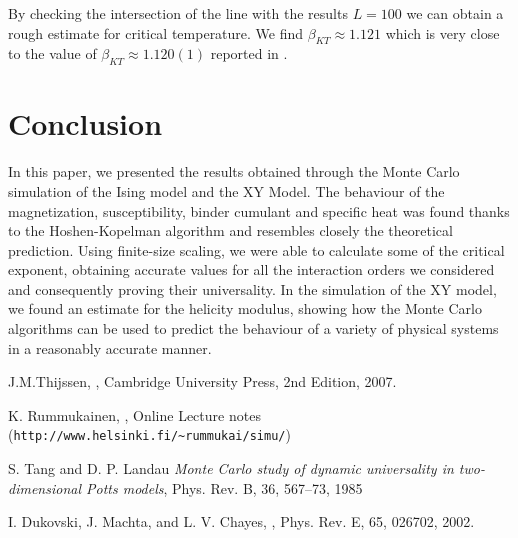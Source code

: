 \documentclass[twoside]{article}
\begin{document}
\begin{multicols}{2}
By checking the intersection of the line with the results $L=100$ we can obtain a rough estimate for critical temperature. We find $\beta_{KT} \approx 1.121$ which is very close to the value of $\beta_{KT} \approx 1.120(1)$ reported in \cite{dukovski}.

\section{Conclusion}
In this paper, we presented the results obtained through the Monte Carlo simulation of the Ising model and the XY Model.
The behaviour of the magnetization, susceptibility, binder cumulant and specific heat was found thanks to the Hoshen-Kopelman algorithm and resembles closely the theoretical prediction. Using finite-size scaling, we were able to calculate some of the critical exponent, obtaining accurate values for all the interaction orders we considered and consequently proving their universality.
In the simulation of the XY model, we found an estimate for the helicity modulus, showing how the Monte Carlo algorithms can be used to predict the behaviour of a variety of physical systems in a reasonably accurate manner.


\begin{thebibliography}{99} %

J.M.Thijssen,
, Cambridge University Press, 2nd Edition, 2007.

K. Rummukainen,
, Online Lecture notes (\verb+http://www.helsinki.fi/~rummukai/simu/+)

S. Tang and D. P. Landau
{\em Monte Carlo study of dynamic universality in two-dimensional Potts models}, Phys. Rev. B, 36, 567–73, 1985

I. Dukovski, J. Machta, and L. V. Chayes, 
, Phys. Rev. E, 65, 026702, 2002.
\end{thebibliography}

\end{multicols}
\end{document}
